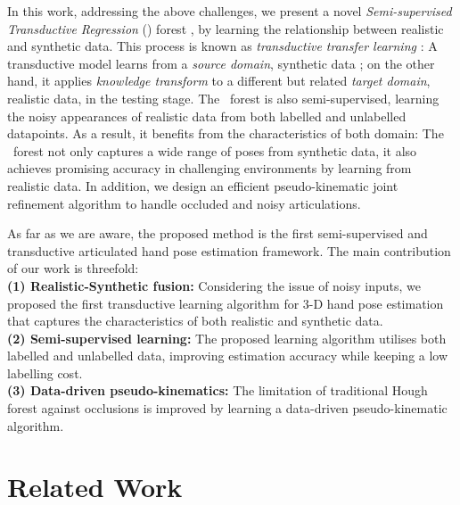 In this work, 
addressing the above challenges, 
we present a novel \emph{Semi-supervised Transductive Regression} (\STR) forest
, by learning the relationship between realistic and synthetic data. 
This process is known as \emph{transductive transfer learning} \cite{Pan2010}:   
A transductive model learns from a \emph{source domain}, \eg synthetic data
; on the other hand, it applies \emph{knowledge transform} to a different but related \emph{target domain}, \eg realistic data, in the testing stage. 
The \STR\ forest is also semi-supervised, learning the noisy appearances of realistic data from both labelled and unlabelled datapoints. As a result, it benefits from the characteristics of both domain: The \STR\ forest not only captures a wide range of poses from synthetic data, it also achieves promising accuracy in challenging environments by learning from realistic data. 
In addition, we design an efficient pseudo-kinematic joint refinement algorithm to 
handle occluded and noisy
articulations. 

As far as we are aware, the proposed method is the first semi-supervised and transductive articulated hand pose estimation framework.  
The main contribution of our work is threefold:\\ 
\textbf{(1) Realistic-Synthetic fusion:} Considering the issue of noisy inputs, we proposed the first transductive learning algorithm for 3-D hand pose estimation that captures the characteristics of both realistic and synthetic data.\\
\textbf{(2) Semi-supervised learning:} The proposed learning algorithm utilises both labelled and unlabelled data, improving estimation accuracy while keeping a low labelling cost.  \\
\textbf{(3) Data-driven pseudo-kinematics:} The limitation of traditional Hough forest\cite{Gall2009} against occlusions is improved by learning a data-driven pseudo-kinematic algorithm.


\section{Related Work}

